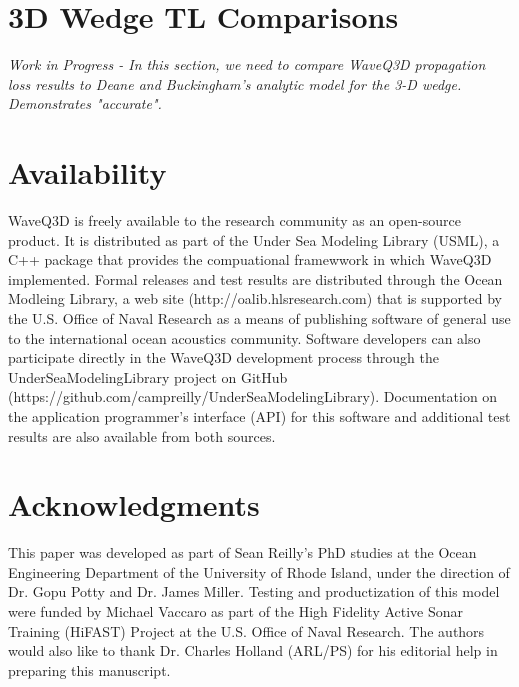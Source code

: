 \documentclass{ws-jca}
\newcommand{\threeD}{3\nobreakdash\textendash D }	%
\begin{document}
\section{\threeD Wedge TL Comparisons}

\emph{Work in Progress - In this section, we need to compare WaveQ3D propagation loss results to Deane and Buckingham's analytic model for the 3-D wedge.  Demonstrates "accurate".}

\section{Availability}

WaveQ3D is freely available to the research community as an open-source product.  It is distributed as part of the Under Sea Modeling Library (USML), a C++ package that provides the compuational framewwork in which WaveQ3D implemented.  Formal releases and test results are distributed through the Ocean Modleing Library, a web site (http://oalib.hlsresearch.com) that is supported by the U.S. Office of Naval Research as a means of publishing software of general use to the international ocean acoustics community.  Software developers can also participate directly in the WaveQ3D development process through the UnderSeaModelingLibrary project on GitHub (https://github.com/campreilly/UnderSeaModelingLibrary).  Documentation on the application programmer's interface (API) for this software and additional test results are also available from both sources.

\section*{Acknowledgments}

This paper was developed as part of Sean Reilly's PhD studies at the Ocean Engineering Department of the University of Rhode Island, under the direction of Dr. Gopu Potty and Dr. James Miller. Testing and productization of this model were funded by Michael Vaccaro as part of the High Fidelity Active Sonar Training (HiFAST) Project at the U.S. Office of Naval Research. The authors would also like to thank Dr. Charles Holland (ARL/PS) for his editorial help in preparing this manuscript.
\end{document}
